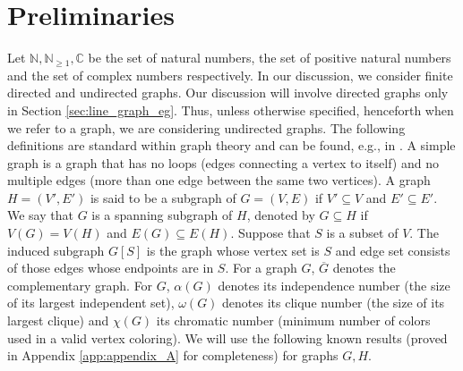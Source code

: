 \documentclass[journal, onecolumn, draftcls]{IEEEtran}
\theoremstyle{definition}
\newcommand{\bbC}{\mathbb{C}}
\newcommand{\bbN}{\mathbb{N}}
\begin{document}
\section{Preliminaries} 
\label{sec:prelim}
Let $\bbN,\bbN_{\ge1},\bbC$ be the set of natural numbers, the set of  positive natural numbers   and the set of complex numbers respectively. In our discussion, we consider finite directed and undirected graphs. %
Our discussion will involve directed graphs only in Section \ref{sec:line_graph_eg}. 
Thus, unless otherwise specified, henceforth when we refer to a graph, we are considering undirected graphs. The following definitions are standard within graph theory and can be found, e.g., in \cite{west_2000}. A simple graph is a graph that has no loops  (edges connecting a vertex to itself) and no multiple edges (more than one edge between the same two vertices).  A graph $H=(V',E')$ is said to be a subgraph of $G = (V,E)$ if $V'\subseteq V$ and $E'\subseteq E'$. We say that $G$ is a spanning subgraph of $H$, denoted by $G\subseteq H$  if $V(G) = V(H)$ and $E(G)\subseteq E(H)$. Suppose that $S$ is a subset of $V$. The induced subgraph $G[S]$ is the graph whose vertex set is $S$ and edge set consists of those edges whose endpoints are in $S$.  For a graph $G$, $\overline{G}$ denotes the complementary graph. For $G$, $\alpha(G)$ denotes its independence number (the size of its largest independent set), $\omega(G)$ denotes its clique number (the size of its largest clique) and $\chi(G)$ its chromatic number (minimum number of colors used in a valid vertex coloring).   We will use the following known results (proved in Appendix \ref{app:appendix_A} for completeness) for graphs $G,H$.
\end{document}
